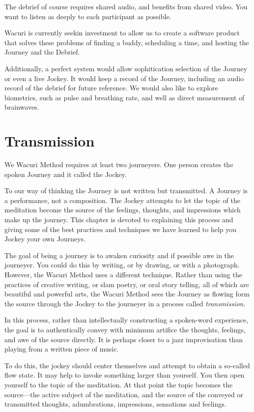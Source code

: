 \documentclass[12pt]{book}
\begin{document}
The debrief of course requires shared audio, and benefits from shared video.
You want to listen as deeply to each participant as possible.

Wacuri is currently seekin investment to allow us to create a software
product that solves these problems of finding a buddy, scheduling a time,
and hosting the Journey and the Debrief.

Additionally, a perfect system would allow sophitication selection of
the Journey or even a live Jockey. It would keep a record of the Journey,
including an audio record of the debrief for future reference. We would
also like to explore biometrics, such as pulse and breathing rate, and
well as direct measurement of brainwaves.


\chapter{Transmission}

We Wacuri Method requires at least two journeyers. One person creates the
spoken Journey and it called the Jockey.

To our way of thinking the Journey is not written but transmitted.
A Journey is a performance, not a composition.
The Jockey attempts to let the topic of the meditation become the
source of the feelings, thoughts, and impressions which make up the journey.
This chapter is devoted to explaining this process and giving some of the
best practices and techniques we have learned to help you Jockey your own
Journeys.

The goal of being a journey is to awaken curiosity and if possible awe
in the journeyer. You could do this by writing, or by drawing, or
with a photograph. However, the Wacuri Method uses a different
technique. Rather than using the practices of creative writing,
or slam poetry, or oral story telling, all of which are beautiful
and powerful arts, the Wacuri Method sees the Journey as flowing
form the source through the Jockey to the journeyer in a process
called {\em transmission}.

In this process, rather than intellectually constructing a spoken-word
experience, the goal is to authentically convey with minimum artifice
the thoughts, feelings, and awe of the source directly. It is
perhaps closer to a jazz improvisation than playing from a
written piece of music.

To do this, the jockey should center themselves and attempt
to obtain a so-called flow state. It may help to invoke something
larger than yourself. You then open yourself to the
topic of the meditation. At that point the topic becomes
the source---the active subject of the meditation, and
the source of the conveyed or transmitted thoughts, adumbrations,
impressions, sensations and feelings.
\end{document}
